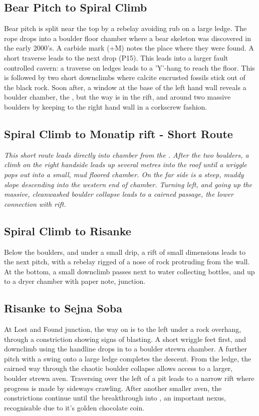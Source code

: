 \subsection{Bear Pitch to Spiral Climb}
Bear pitch is split near the top by a rebelay avoiding rub on a large ledge. The rope drops into a boulder floor chamber where a bear skeleton was discovered in the early 2000's. A carbide mark (+M) notes the place where they were found. A short traverse leads to the next drop (P15). This leads into a larger fault controlled cavern: a traverse on ledges leads to a 'Y'-hang to reach the floor. This is followed by two short downclimbs where calcite encrusted fossils stick out of the black rock. Soon after, a window at the base of the left hand wall reveals a boulder chamber, the , but the way is in the rift, and around two massive boulders by keeping to the right hand wall in a corkscrew fashion. 

\subsection{Spiral Climb to Monatip rift - Short Route}
\textit{This short route leads directly into  chamber from the . After the two boulders, a climb on the right handside leads up several metres into the roof until a wriggle pops out into a small, mud floored chamber. On the far side is a steep, muddy slope descending into the western end of  chamber. Turning left, and going up the massive, cleanwashed boulder collapse leads to a cairned passage, the lower connection with  rift.} 

\subsection{Spiral Climb to Risanke}
Below the boulders, and under a small drip, a rift of small dimensions leads to the next pitch, with a rebelay rigged of a nose of rock protruding from the wall. At the bottom, a small downclimb passes next to water collecting bottles, and up to a dryer chamber with paper note,  junction.

\subsection{Risanke to Sejna Soba}
At Lost and Found junction, the way on is to the left under a rock overhang, through a constriction showing signs of blasting. A short wriggle feet first, and downclimb using the handline drops in to a boulder strewn chamber. A further pitch with a swing onto a large ledge completes the descent. From the ledge, the cairned way through the chaotic boulder collapse allows access to a larger, boulder strewn aven. Traversing over the left  of a pit leads to a narrow rift where progress is made by sideways crawling. After another smaller aven, the constrictions continue until the breakthrough into , an important nexus, recognisable due to it’s golden chocolate coin.

